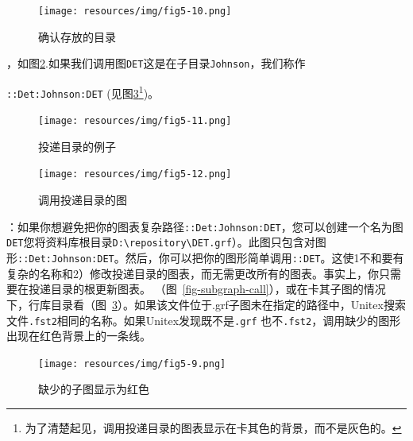 \begin{figure}[!h]
\begin{center}
\texttt{[image: resources/img/fig5-10.png]}
\caption{确认存放的目录\label{directories}}
\end{center}
\end{figure}

\bigskip
{}，如图\ref{repository}.如果我们调用图\verb+DET+这是在子目录\verb+Johnson+，我们称作

\noindent \verb+::Det:Johnson:DET+
(见图\ref{repository-graph-call}\footnote{为了清楚起见，调用投递目录的图表显示在卡其色的背景，而不是灰色的。})。

\begin{figure}[!h]
\begin{center}
\texttt{[image: resources/img/fig5-11.png]}
\caption{投递目录的例子\label{repository}}
\end{center}
\end{figure}

\begin{figure}[!h]
\begin{center}
\texttt{[image: resources/img/fig5-12.png]}
\caption{调用投递目录的图\label{repository-graph-call}}
\end{center}
\end{figure}

\bigskip
{}：如果你想避免把你的图表复杂路径\verb+::Det:Johnson:DET+，您可以创建一个名为图\verb+DET+您将资料库根目录\verb+D:\repository\DET.grf+）。此图只包含对图形\verb+::Det:Johnson:DET+。然后，你可以把你的图形简单调用\verb+::DET+。这使1不和要有复杂的名称和2）修改投递目录的图表，而无需更改所有的图表。事实上，你只需要在投递目录的根更新图表。
\bigskip
{}（图~\ref{fig-subgraph-call}），或在卡其子图的情况下，行库目录看（图~\ref{repository-graph-call}）。如果该文件位于\verb++.grf子图未在指定的路径中，Unitex搜索文件\verb+.fst2+相同的名称。如果Unitex发现既不是\verb+.grf+ 也不\verb+.fst2+，调用缺少的图形出现在红色背景上的一条线。


\begin{figure}[h!]
\begin{center}
\texttt{[image: resources/img/fig5-9.png]}
\caption{缺少的子图显示为红色}
\end{center}
\end{figure}


